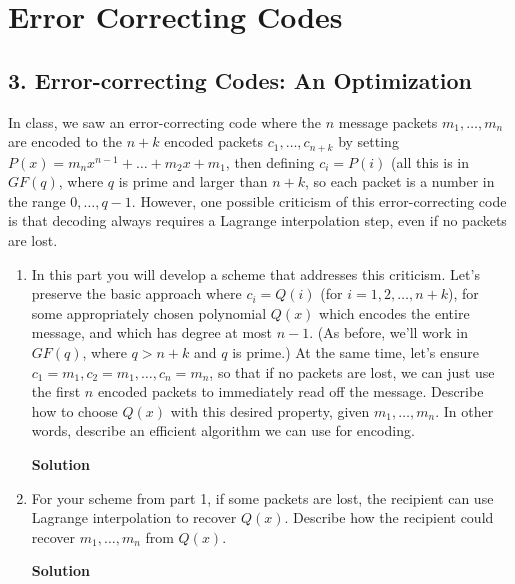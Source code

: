 \documentclass{article}\usepackage{amsmath,amssymb,amsthm,tikz,tkz-graph,color,chngpage,soul,hyperref,csquotes,graphicx,floatrow}\newcommand*{\QEDB}{\hfill\ensuremath{\square}}\newtheorem*{prop}{Proposition}\renewcommand{\theenumi}{\alph{enumi}}\usepackage[shortlabels]{enumitem}\usepackage[nobreak=true]{mdframed}\usetikzlibrary{matrix,calc}\MakeOuterQuote{"}\usepackage[margin=0.75in]{geometry} \newtheorem{theorem}{Theorem}
\begin{document}
\section*{Error Correcting Codes}

\subsection*{3. Error-correcting Codes: An Optimization}
In class, we saw an error-correcting code where the $n$ message packets $m_1,\ldots, m_n$ are encoded to the $n+k$ encoded packets $c_1,\ldots,c_{n+k}$ by setting $P(x)=m_nx^{n-1}+\ldots+m_2x+m_1$, then defining $c_i=P(i)$ (all this is in $GF(q)$, where $q$ is prime and larger than $n+k$, so each packet is a number in the range $0,\ldots,q-1$. However, one possible criticism of this error-correcting code is that decoding always requires a Lagrange interpolation step, even if no packets are lost.
\begin{enumerate}
\item In this part you will develop a scheme that addresses this criticism. Let's preserve the basic approach where $c_i=Q(i)$ (for $i=1,2,\ldots,n+k$), for some appropriately chosen polynomial $Q(x)$ which encodes the entire message, and which has degree at most $n-1$. (As before, we'll work in $GF(q)$, where $q>n+k$ and $q$ is prime.) At the same time, let's ensure $c_1=m_1, c_2=m_1,\ldots,c_n=m_n$, so that if no packets are lost, we can just use the first $n$ encoded packets to immediately read off the message. Describe how to choose $Q(x)$ with this desired property, given $m_1,\ldots,m_n$. In other words, describe an efficient algorithm we can use for encoding.
\begin{mdframed}
\textbf{Solution}

\end{mdframed}
\item For your scheme from part 1, if some packets are lost, the recipient can use Lagrange interpolation to recover $Q(x)$. Describe how the recipient could recover $m_1,\ldots,m_n$ from $Q(x)$.
\begin{mdframed}
\textbf{Solution}

\end{mdframed}
\end{enumerate}
\clearpage

\end{document}
